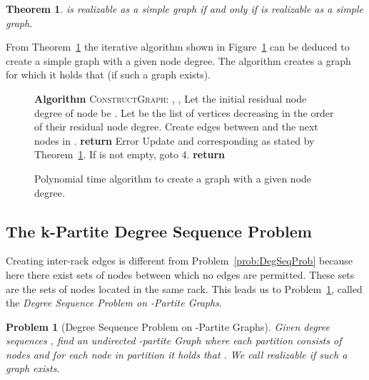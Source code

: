 \documentclass[journal,10pt]{IEEEtran}
\newtheorem{theorem}{Theorem}
\newtheorem{problem}{Problem}
\begin{document}
		\begin{theorem}
		 is realizable as a simple graph if and only if 
		is realizable as a simple graph.\\
			\label{theo:2}
		\end{theorem}

		
		
		From Theorem~\ref{theo:2} the iterative algorithm shown in Figure~\ref{algo:1} can be deduced to create a simple graph with a given node degree.
		The algorithm creates a graph for which it holds that  (if such a graph exists).
			



\begin{figure}
\begin{algorithmic}[1]
	\State \textbf{Algorithm} \textsc{ConstructGraph}:
	\State , , 
	\State Let the initial residual node degree of node  be .
	\State Let  be the list of vertices decreasing in the order of their residual node degree.
	\State Create edges between  and the next  nodes in .
		\State \textbf{return} Error
	\EndIf
	\State Update  and corresponding  as stated by Theorem~\ref{theo:2}.
	\State If  is not empty, goto 4.
	\State \textbf{return} 
\end{algorithmic}
	\caption{Polynomial time algorithm to create a graph with a given node degree.}
	\label{algo:1}
\end{figure}
		
		
		
		
		
	\subsection{The k-Partite Degree Sequence Problem}

	

		Creating inter-rack edges is different from Problem~\ref{prob:DegSeqProb} because here there exist sets of nodes
		between which no edges are permitted.
		These sets are the sets of nodes located in the same rack.
		This leads us to
		Problem~\ref{problem:equalKpartiteDegreeSequence}, called the \emph{Degree Sequence Problem on -Partite Graphs}.
\begin{problem}[Degree Sequence Problem on -Partite Graphs]
			Given  degree sequences , find
			an undirected -partite Graph  where each partition  consists of  nodes and for each node  in partition
			 it holds that .
			We call  \emph{realizable} if such a graph exists.
			\label{problem:equalKpartiteDegreeSequence}
		\end{problem}
\end{document}
